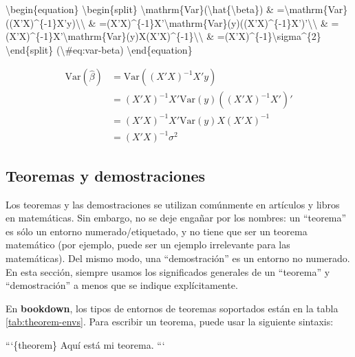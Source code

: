 \documentclass[12pt,]{krantz}
\makeatletter
\newenvironment{Shaded}{\begin{snugshade}}{\end{snugshade}}
\newcommand{\NormalTok}[1]{{#1}}
\newenvironment{kframe}{%
\medskip{}
\setlength{\fboxsep}{.8em}
 \def\at@end@of@kframe{}%
 \ifinner\ifhmode%
  \def\at@end@of@kframe{\end{minipage}}%
  \begin{minipage}{\columnwidth}%
 \fi\fi%
 \def\FrameCommand##1{\hskip\@totalleftmargin \hskip-\fboxsep
 \colorbox{shadecolor}{##1}\hskip-\fboxsep
     \hskip-\linewidth \hskip-\@totalleftmargin \hskip\columnwidth}%
 \MakeFramed {\advance\hsize-\width
   \@totalleftmargin\z@ \linewidth\hsize
   \@setminipage}}%
 {\par\unskip\endMakeFramed%
 \at@end@of@kframe}
\renewenvironment{Shaded}{\begin{kframe}}{\end{kframe}}
\theoremstyle{definition}
\theoremstyle{definition}
\theoremstyle{remark}
\makeatother
\begin{document}
\begin{Shaded}
\begin{Highlighting}[]
\NormalTok{\textbackslash{}begin\{equation\} }
\NormalTok{\textbackslash{}begin\{split\}}
\NormalTok{\textbackslash{}mathrm\{Var\}(\textbackslash{}hat\{\textbackslash{}beta\}) & =\textbackslash{}mathrm\{Var\}((X'X)^\{-1\}X'y)\textbackslash{}\textbackslash{}}
 \NormalTok{& =(X'X)^\{-1\}X'\textbackslash{}mathrm\{Var\}(y)((X'X)^\{-1\}X')'\textbackslash{}\textbackslash{}}
 \NormalTok{& =(X'X)^\{-1\}X'\textbackslash{}mathrm\{Var\}(y)X(X'X)^\{-1\}\textbackslash{}\textbackslash{}}
 \NormalTok{& =(X'X)^\{-1\}\textbackslash{}sigma^\{2\}}
\NormalTok{\textbackslash{}end\{split\}}
\NormalTok{(\textbackslash{}#eq:var-beta)}
\NormalTok{\textbackslash{}end\{equation\} }
\end{Highlighting}
\end{Shaded}

\begin{equation}
\begin{split}
\mathrm{Var}(\hat{\beta}) & =\mathrm{Var}((X'X)^{-1}X'y)\\
 & =(X'X)^{-1}X'\mathrm{Var}(y)((X'X)^{-1}X')'\\
 & =(X'X)^{-1}X'\mathrm{Var}(y)X(X'X)^{-1}\\
 & =(X'X)^{-1}\sigma^{2}
\end{split}
\label{eq:var-beta}
\end{equation}

\subsection{Teoremas y demostraciones}\label{teoremas}

Los teoremas y las demostraciones se utilizan comúnmente en artículos y
libros en matemáticas. Sin embargo, no se deje engañar por los nombres:
un ``teorema'' es sólo un entorno numerado/etiquetado, y no tiene que
ser un teorema matemático (por ejemplo, puede ser un ejemplo irrelevante
para las matemáticas). Del mismo modo, una ``demostración'' es un
entorno no numerado. En esta sección, siempre usamos los significados
generales de un ``teorema'' y ``demostración'' a menos que se indique
explícitamente.

En \textbf{bookdown}, los tipos de entornos de teoremas soportados están
en la tabla \ref{tab:theorem-envs}. Para escribir un teorema, puede usar
la siguiente sintaxis:

\begin{Shaded}
\begin{Highlighting}[]
\NormalTok{```\{theorem\}}
\NormalTok{Aquí está mi teorema.}
\NormalTok{```}
\end{Highlighting}
\end{Shaded}
\end{document}
